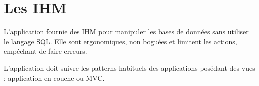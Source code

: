 \section{Les IHM}
L'application fournie des IHM pour manipuler les bases de données sans utiliser le langage SQL.
Elle sont ergonomiques, non boguées et limitent les actions, empéchant de faire  erreurs.

L'application doit suivre les patterns habituels des applications posédant des vues :
application en couche ou MVC.
